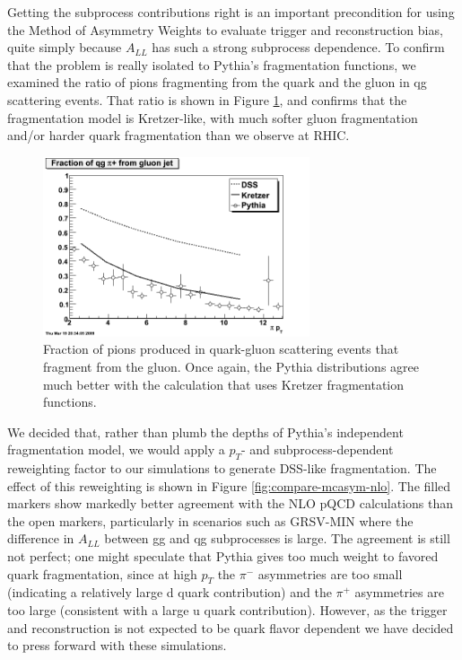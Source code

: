 Getting the subprocess contributions right is an important precondition for
using the Method of Asymmetry Weights to evaluate trigger and reconstruction
bias, quite simply because $A_{LL}$ has such a strong subprocess dependence.
To confirm that the problem is really isolated to Pythia's fragmentation
functions, we examined the ratio of pions fragmenting from the quark and the
gluon in qg scattering events. That ratio is shown in Figure
\ref{fig:qg-fragmentation}, and confirms that the fragmentation model is
Kretzer-like, with much softer gluon fragmentation and/or harder quark
fragmentation than we observe at RHIC.

\begin{figure}
  \begin{center}
    \includegraphics[width=0.7\textwidth]{figures/qg-fragmentation}
  \end{center}
  \caption{Fraction of pions produced in quark-gluon scattering events that
  fragment from the gluon. Once again, the Pythia distributions agree much
  better with the calculation that uses Kretzer fragmentation functions.}
  \label{fig:qg-fragmentation}
\end{figure}

We decided that, rather than plumb the depths of Pythia's independent
fragmentation model, we would apply a $p_{T}$- and subprocess-dependent
reweighting factor to our simulations to generate DSS-like fragmentation. The
effect of this reweighting is shown in Figure \ref{fig:compare-mcasym-nlo}.
The filled markers show markedly better agreement with the NLO pQCD
calculations than the open markers, particularly in scenarios such as GRSV-MIN
where the difference in $A_{LL}$ between gg and qg subprocesses is large. The
agreement is still not perfect; one might speculate that Pythia gives too much
weight to favored quark fragmentation, since at high $p_{T}$ the $\pi^{-}$
asymmetries are too small (indicating a relatively large d quark contribution)
and the $\pi^{+}$ asymmetries are too large (consistent with a large u quark
contribution). However, as the trigger and reconstruction is not expected to
be quark flavor dependent we have decided to press forward with these
simulations.

